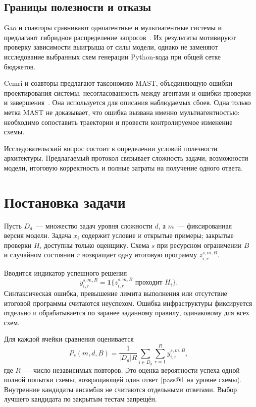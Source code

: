 \documentclass{misisarticle}
\begin{document}
\subsection{Границы полезности и отказы}
Gao и соавторы сравнивают одноагентные и мультиагентные системы и предлагают гибридное распределение запросов~\cite{hybrid}. Их результаты мотивируют проверку зависимости выигрыша от силы модели, однако не заменяют исследование выбранных схем генерации Python-кода при общей сетке бюджетов.

Cemri и соавторы предлагают таксономию MAST, объединяющую ошибки проектирования системы, несогласованность между агентами и ошибки проверки и завершения~\cite{mast}. Она используется для описания наблюдаемых сбоев. Одна только метка MAST не доказывает, что ошибка вызвана именно мультиагентностью: необходимо сопоставить траектории и провести контролируемое изменение схемы.

Исследовательский вопрос состоит в определении условий полезности архитектуры. Предлагаемый протокол связывает сложность задачи, возможности модели, итоговую корректность и полные затраты на получение одного ответа.

\section{Постановка задачи}
Пусть $D_d$~--- множество задач уровня сложности $d$, а $m$~--- фиксированная версия модели. Задача $x_i$ содержит условие и открытые примеры; закрытые проверки $H_i$ доступны только оценщику. Схема $s$ при ресурсном ограничении $B$ и случайном состоянии $r$ возвращает одну итоговую программу $z_{i,r}^{s,m,B}$.

Вводится индикатор успешного решения
\begin{equation}
 y_{i,r}^{s,m,B}=\mathbf{1}\{z_{i,r}^{s,m,B}\text{ проходит }H_i\}.
\end{equation}
Синтаксическая ошибка, превышение лимита выполнения или отсутствие итоговой программы считаются неуспехом. Ошибка инфраструктуры фиксируется отдельно и обрабатывается по заранее заданному правилу, одинаковому для всех схем.

Для каждой ячейки сравнения оценивается
\begin{equation}
 P_s(m,d,B)=\frac{1}{|D_d|R}\sum_{i\in D_d}\sum_{r=1}^{R}y_{i,r}^{s,m,B},
\end{equation}
где $R$~--- число независимых повторов. Это оценка вероятности успеха одной полной попытки схемы, возвращающей один ответ (pass@1 на уровне схемы). Внутренние кандидаты ансамбля не считаются отдельными ответами. Выбор лучшего кандидата по закрытым тестам запрещён.
\end{document}
